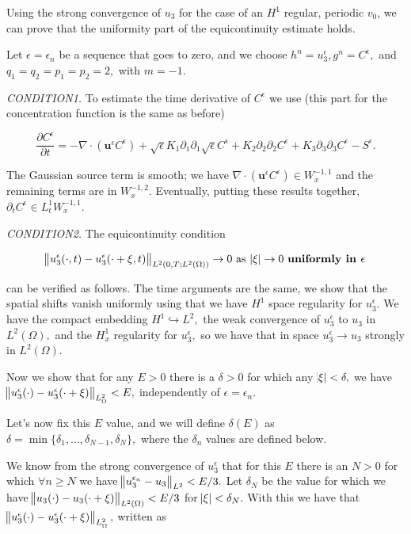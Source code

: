 \documentclass[11pt]{article}
\begin{document}
  Using the strong convergence of $u_3$ for the case of an $H^1$ regular, periodic $v_0$, we can prove that the uniformity part of the equicontinuity estimate holds.
  
  Let $\epsilon = \epsilon_n$ be a sequence that goes to zero, and we choose $h^n = u^{\epsilon}_3, g^n = C^{\epsilon},$ and $q_1 = q_2 = p_1 = p_2 = 2,$ with $ m=-1.$

\textit{CONDITION1.} To estimate the time derivative of $C^{\epsilon}$ we use (this part for the concentration function is the same as before)

$$  \frac{\partial C^{\epsilon}}{\partial t} = - \nabla \cdot (\mathbf{u}^{\epsilon} C^{\epsilon}) + \sqrt{\epsilon} K_1 \partial_1 \partial_1 \sqrt{\epsilon} C^{\epsilon} + K_2 \partial_2 \partial_2 C^{\epsilon} + K_3 \partial_3 \partial_3 C^{\epsilon} -S^{\epsilon}. $$

The Gaussian source term is smooth; we have $ \nabla \cdot (\mathbf{u}^{\epsilon} C^{\epsilon}) \in W_x^{-1,1}$ and the remaining terms are in $W_x^{-1,2}.$ Eventually, putting these results together, $\partial_t C^{\epsilon} \in L_t^1 W_x^{-1,1}.$
         
\textit{CONDITION2.} The equicontinuity condition

$$\norm{u_3^{\epsilon}(\cdot, t) - u_3^{\epsilon} (\cdot + \xi, t)}_{L^2(0,T; L^2(\Omega))} \to 0 \text{ as } \abs{\xi} \to 0 \text{ \textbf{uniformly in }} \mathbf{\epsilon} $$

can be verified as follows. The time arguments are the same, we show that the spatial shifts vanish uniformly using that we have $H^1$ space regularity for $u^{\epsilon}_3.$
We have the compact embedding $H^1 \hookrightarrow L^2,$ the weak convergence of $u^{\epsilon}_3$ to $u_3$ in $L^2(\Omega),$ and the $H^1_x$ regularity for $u_3^{\epsilon},$ so we have that in space $u^{\epsilon}_3 \to u_3$ strongly in $L^2 (\Omega).$

Now we show that for any $E > 0$ there is a $\delta > 0$ for which any $\abs{\xi} < \delta,$ we have $\norm{u_3^{\epsilon}(\cdot) - u_3^{\epsilon}(\cdot + \xi)}_{L^2_\Omega} < E,$ independently of $\epsilon = \epsilon_n.$

Let's now fix this $E$ value, and we will define $\delta (E)$ as $\delta = \min{\{\delta_1, ... , \delta_{N-1}, \delta_N\}},$ where the $\delta_n$ values are defined below.

We know from the strong convergence of $u_3^{\epsilon}$ that for this $E$ there is an $N > 0$ for which $\forall n \geq N$ we have $\norm{u_3^{\epsilon_n}-u_3}_{L^2} < E / 3.$ Let $\delta_N $ be the value for which we have  $\norm{u_3(\cdot) - u_3(\cdot + \xi) }_{L^2(\Omega)} < E / 3$ for $\abs{\xi} < \delta_N.$ With this we have that $ \norm{u_3^{\epsilon}(\cdot) - u_3^{\epsilon}(\cdot + \xi)}_{L^2_\Omega},$ written as
\end{document}
